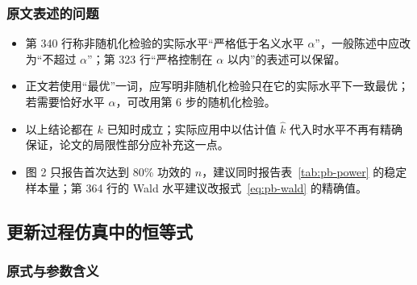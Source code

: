 \subsubsection{原文表述的问题}

\begin{itemize}
\item 第 340 行称非随机化检验的实际水平“严格低于名义水平 $\alpha$”，一般陈述中应改为“不超过 $\alpha$”；第 323 行“严格控制在 $\alpha$ 以内”的表述可以保留。
\item 正文若使用“最优”一词，应写明非随机化检验只在它的实际水平下一致最优；若需要恰好水平 $\alpha$，可改用第 6 步的随机化检验。
\item 以上结论都在 $k$ 已知时成立；实际应用中以估计值 $\hat k$ 代入时水平不再有精确保证，论文的局限性部分应补充这一点。
\item 图 2 只报告首次达到 80\% 功效的 $n$，建议同时报告表~\ref{tab:pb-power} 的稳定样本量；第 364 行的 Wald 水平建议改报式~\eqref{eq:pb-wald} 的精确值。
\end{itemize}

\subsection{更新过程仿真中的恒等式}

\subsubsection{原式与参数含义}

